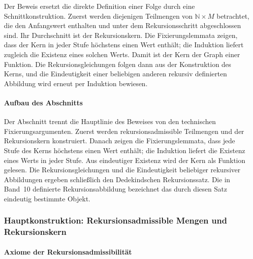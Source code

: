 \par{}
Der Beweis ersetzt die direkte Definition einer Folge durch eine
Schnittkonstruktion. Zuerst werden diejenigen Teilmengen von
\(\mathbb{N}\times M\) betrachtet, die den Anfangswert enthalten und unter dem
Rekursionsschritt abgeschlossen sind. Ihr Durchschnitt ist der Rekursionskern.
Die Fixierungslemmata zeigen, dass der Kern in jeder Stufe höchstens einen
Wert enthält; die Induktion liefert zugleich die Existenz eines solchen Werts.
Damit ist der Kern der Graph einer Funktion. Die Rekursionsgleichungen folgen
dann aus der Konstruktion des Kerns, und die Eindeutigkeit einer beliebigen
anderen rekursiv definierten Abbildung wird erneut per Induktion bewiesen.

\paragraph{Aufbau des Abschnitts}

Der Abschnitt trennt die Hauptlinie des Beweises von den technischen
Fixierungsargumenten. Zuerst werden rekursionsadmissible Teilmengen und der
Rekursionskern konstruiert. Danach zeigen die Fixierungslemmata, dass jede
Stufe des Kerns höchstens einen Wert enthält; die Induktion liefert die
Existenz eines Werts in jeder Stufe. Aus eindeutiger Existenz wird der Kern als
Funktion gelesen. Die Rekursionsgleichungen und die Eindeutigkeit beliebiger
rekursiver Abbildungen ergeben schließlich den Dedekindschen Rekursionssatz.
Die in Band~10 definierte Rekursionsabbildung bezeichnet das durch diesen
Satz eindeutig bestimmte Objekt.

\subsubsection{Hauptkonstruktion: Rekursionsadmissible Mengen und Rekursionskern}

\paragraph{Axiome der Rekursionsadmissibilität}

\par{}

\par{}

